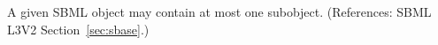 A given SBML object may contain at most one \Notes subobject.  (References:
SBML L3V2 Section~\ref{sec:sbase}.)

